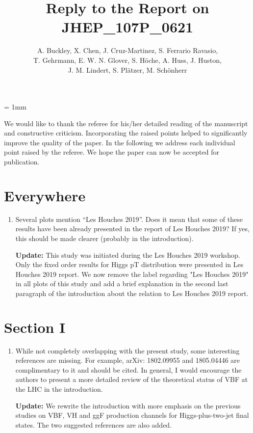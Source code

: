 \documentclass[12pt]{article}
\begin{document}
\unitlength = 1mm
\title{Reply to the Report on JHEP\_107P\_0621}
\author{A. Buckley, X. Chen, J. Cruz-Martinez, S. Ferrario Ravasio,\\ T. Gehrmann, E. W. N. Glover, S. H{\"o}che, A. Huss, J. Huston,\\ J. M. Lindert, S. Pl{\"a}tzer, M. Sch{\"o}nherr}
\date{}
\maketitle

We would like to thank the referee for his/her detailed reading of the manuscript and constructive criticism. Incorporating the raised points helped to significantly improve the quality of the paper.
In the following we address each individual point raised by the referee. We hope the paper can now be accepted for publication.

\section*{Everywhere}
\begin{enumerate}
	\item Several plots mention “Les Houches 2019”. Does it mean that some of these results have been already presented in the report of Les Houches 2019? If yes, this should be made clearer (probably in the introduction).

{\bf Update:} This study was initiated during the Les Houches 2019 workshop. Only the fixed order results for Higgs pT distribution were presented in Les Houches 2019 report. We now remove the label regarding "Les Houches 2019" in all plots of this study and add a brief explanation in the second last paragraph of the introduction about the relation to Les Houches 2019 report. 
\end{enumerate}

\section*{Section I}
\begin{enumerate}
\item While not completely overlapping with the present study, some interesting references are missing. For example, arXiv: 1802.09955 and 1805.04446 are complimentary to it and should be cited. In general, I would encourage the authors to present a more detailed review of the theoretical status of VBF at the LHC in the introduction.

{\bf Update:} We rewrite the introduction with more emphasis on the previous studies on VBF, VH and ggF production channels for Higgs-plus-two-jet final states. The two suggested references are also added.

\end{enumerate}
\end{document}
